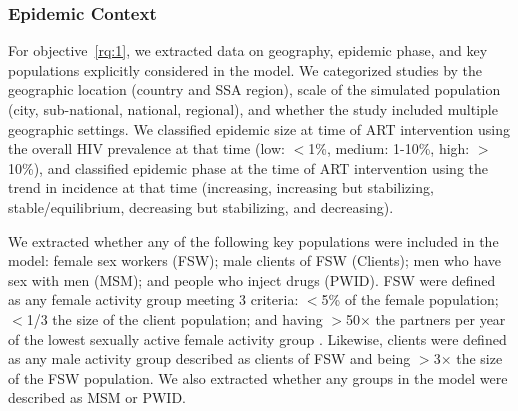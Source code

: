 \subsubsection{Epidemic Context}
\label{sss:meth:context}
For objective~\ref{rq:1}, we extracted data on
geography, epidemic phase, and key populations explicitly considered in the model.
We categorized studies by the geographic location (country and SSA region),
scale of the simulated population (city, sub-national, national, regional), and
whether the study included multiple geographic settings.
We classified epidemic size at time of ART intervention using
the overall HIV prevalence at that time (low: $<$1\%, medium: 1-10\%, high: $>$10\%),
and classified epidemic phase at the time of ART intervention
using the trend in incidence at that time
(increasing, increasing but stabilizing, stable/equilibrium, decreasing but stabilizing, and decreasing).
\par
We extracted whether any of the following key populations were included in the model:
female sex workers (FSW);
male clients of FSW (Clients);
men who have sex with men (MSM); and
people who inject drugs (PWID).
FSW were defined as any female activity group meeting 3 criteria:
{$<$5\%} of the female population;
{$<$1/3} the size of the client population; and
having {$>$50$\times$} the partners per year of
the lowest sexually active female activity group \cite{Vandepitte2006,Scorgie2012}.
Likewise, clients were defined as any male activity group
described as clients of FSW and being {$>$3$\times$} the size of the FSW population.
We also extracted whether any groups in the model were described as MSM or PWID.
